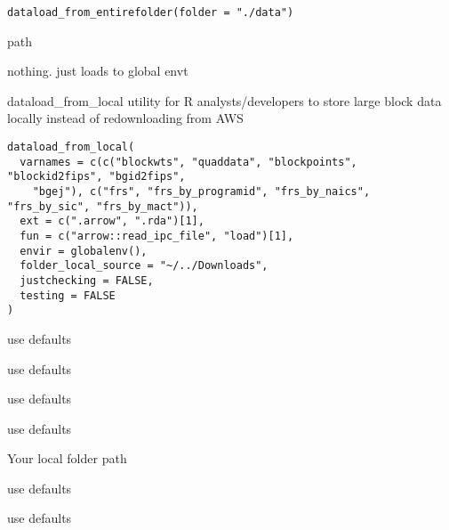 \documentclass[a4paper]{book}
\begin{document}
%
\begin{Usage}
\begin{verbatim}
dataload_from_entirefolder(folder = "./data")
\end{verbatim}
\end{Usage}
%
\begin{Arguments}
\begin{ldescription}
\item[\code{folder}] path
\end{ldescription}
\end{Arguments}
%
\begin{Value}
nothing. just loads to global envt
\end{Value}
%
\begin{Description}\relax
dataload\_from\_local
utility for R analysts/developers to store large block data locally instead of redownloading from AWS
\end{Description}
%
\begin{Usage}
\begin{verbatim}
dataload_from_local(
  varnames = c(c("blockwts", "quaddata", "blockpoints", "blockid2fips", "bgid2fips",
    "bgej"), c("frs", "frs_by_programid", "frs_by_naics", "frs_by_sic", "frs_by_mact")),
  ext = c(".arrow", ".rda")[1],
  fun = c("arrow::read_ipc_file", "load")[1],
  envir = globalenv(),
  folder_local_source = "~/../Downloads",
  justchecking = FALSE,
  testing = FALSE
)
\end{verbatim}
\end{Usage}
%
\begin{Arguments}
\begin{ldescription}
\item[\code{varnames}] use defaults

\item[\code{ext}] use defaults

\item[\code{fun}] use defaults

\item[\code{envir}] use defaults

\item[\code{folder\_local\_source}] Your local folder path

\item[\code{justchecking}] use defaults

\item[\code{testing}] use defaults
\end{ldescription}
\end{Arguments}
\end{document}
